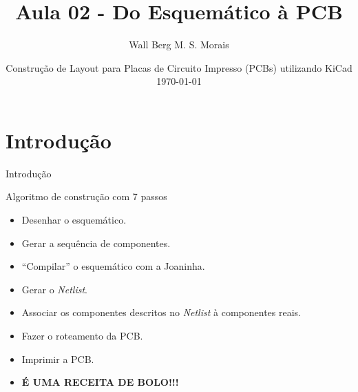 \documentclass{beamer}
\title[Aula 02 - Confecção de PCB]{Aula 02 - Do Esquemático à PCB}
\author[CAECP]{Wall Berg M. S. Morais}
\institute[UTFPR] 
{
  Departamento de Informática - DAINF \\
  Universidade Tecnológica Federal do Paraná
}
\date[\today]{Construção de Layout para Placas de Circuito Impresso (PCBs) utilizando KiCad\\\today}
\begin{document}
\begin{frame}
  \titlepage
\end{frame}

\begin{frame}
	\tableofcontents
\end{frame}

\section{Introdução}
\begin{frame}{Introdução}
	\begin{block}{Algoritmo de construção com 7 passos}
		\begin{itemize}
			\item Desenhar o esquemático.
			\item Gerar a sequência de componentes.
			\item ``Compilar'' o esquemático com a Joaninha.
			\pause
			\item Gerar o \textit{Netlist}.
			\item Associar os componentes descritos no \textit{Netlist} à componentes reais.
			\item Fazer o roteamento da PCB.
			\item Imprimir a PCB.
			\pause
			\item \textbf{É UMA RECEITA DE BOLO!!!}
		\end{itemize}
	\end{block}	
\end{frame}
\end{document}

